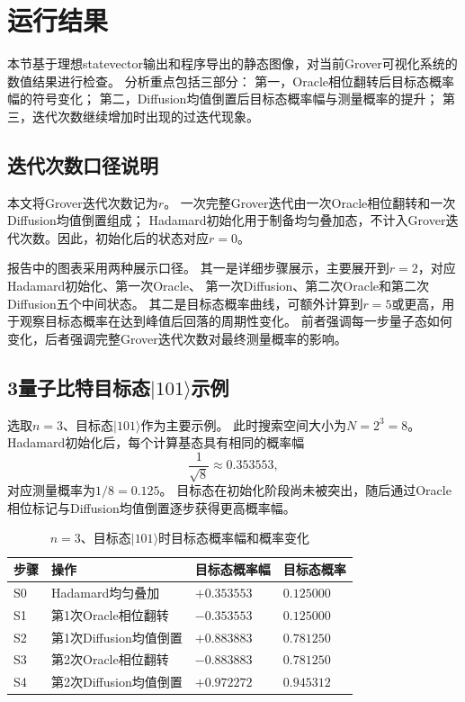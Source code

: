 \section{运行结果}

本节基于理想statevector输出和程序导出的静态图像，对当前Grover可视化系统的数值结果进行检查。
分析重点包括三部分：
第一，Oracle相位翻转后目标态概率幅的符号变化；
第二，Diffusion均值倒置后目标态概率幅与测量概率的提升；
第三，迭代次数继续增加时出现的过迭代现象。

\subsection{迭代次数口径说明}

本文将Grover迭代次数记为\(r\)。
一次完整Grover迭代由一次Oracle相位翻转和一次Diffusion均值倒置组成；
Hadamard初始化用于制备均匀叠加态，不计入Grover迭代次数。因此，初始化后的状态对应\(r=0\)。

报告中的图表采用两种展示口径。
其一是详细步骤展示，主要展开到\(r=2\)，对应Hadamard初始化、第一次Oracle、
第一次Diffusion、第二次Oracle和第二次Diffusion五个中间状态。
其二是目标态概率曲线，可额外计算到\(r=5\)或更高，用于观察目标态概率在达到峰值后回落的周期性变化。
前者强调每一步量子态如何变化，后者强调完整Grover迭代次数对最终测量概率的影响。

\subsection{3量子比特目标态\texorpdfstring{\(|101\rangle\)}{|101>}示例}

选取\(n=3\)、目标态\(|101\rangle\)作为主要示例。
此时搜索空间大小为\(N=2^3=8\)。Hadamard初始化后，每个计算基态具有相同的概率幅
\[
  \frac{1}{\sqrt{8}}\approx 0.353553,
\]
对应测量概率为\(1/8=0.125\)。
目标态在初始化阶段尚未被突出，随后通过Oracle相位标记与Diffusion均值倒置逐步获得更高概率幅。

\begin{table}[!htbp]
  \centering
  \caption{\(n=3\)、目标态\(|101\rangle\)时目标态概率幅和概率变化}
  \begin{tabular}{llll}
    \toprule
    步骤 & 操作               & 目标态概率幅        & 目标态概率        \\
    \midrule
    S0 & Hadamard均匀叠加     & \(+0.353553\) & \(0.125000\) \\
    S1 & 第1次Oracle相位翻转    & \(-0.353553\) & \(0.125000\) \\
    S2 & 第1次Diffusion均值倒置 & \(+0.883883\) & \(0.781250\) \\
    S3 & 第2次Oracle相位翻转    & \(-0.883883\) & \(0.781250\) \\
    S4 & 第2次Diffusion均值倒置 & \(+0.972272\) & \(0.945312\) \\
    \bottomrule
  \end{tabular}
\end{table}

